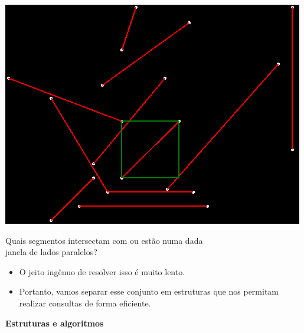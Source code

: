 \documentclass[
paper=128mm:96mm, %
fontsize=11pt, %
pagesize, %
parskip=half-, %
]{scrartcl} %
\theoremstyle{mythmstyle} %
\begin{document}
\includegraphics[scale=0.35]{2}
\begin{flushleft}
  \par Quais segmentos intersectam com ou estão numa dada\\ janela de lados paralelos?
\end{flushleft}
\clearpage



\begin{flushleft}
  \begin{itemize}
  \item O jeito ingênuo de resolver isso é muito lento.
  \item Portanto, vamos separar esse conjunto em estruturas que nos permitam realizar consultas de forma eficiente.
  \end{itemize}
\end{flushleft}
\clearpage


\thispagestyle{empty} %

\begin{flushleft}
\vspace{0.6cm}
\color{white}\sffamily
{\bfseries\Huge Estruturas e algoritmos\par} %
\vfill
\end{flushleft}
\end{document}
